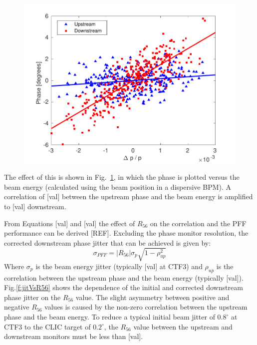 \documentclass[%
 reprint,
 superscriptaddress,
 amsmath,
 amssymb,
 prstab,
]{revtex4-1}
\begin{document}
\begin{figure}
	\includegraphics[width=\columnwidth]{figs/prop/UpDownEnCorr}
	\caption{\label{f:UpDownEnCorr}
	}
\end{figure}

The effect of this is shown in Fig.~\ref{f:UpDownEnCorr}, in which the phase is 
plotted versus the beam energy (calculated using the beam position in a 
dispersive BPM). A correlation of [val] between the upstream phase and the beam 
energy is amplified to [val] downstream.

From Equations [val] and [val] the effect of \(R_{56}\) on the correlation and 
the PFF performance can be derived [REF]. Excluding the phase monitor 
resolution, the 
corrected downstream phase jitter that can be achieved is given by:
\begin{equation}
\sigma_{PFF} = \left|R_{56}\right|\sigma_p\sqrt{1-\rho_{up}^2}
\label{e:r56PFFJit}
\end{equation}
Where \(\sigma_p\) is the beam energy jitter (typically [val] at CTF3) and 
\(\rho_{up}\) is the correlation between the upstream phase and the beam energy 
(typically [val]). Fig.\ref{f:jitVsR56} shows the dependence of the initial and 
corrected downstream phase jitter on the \(R_{56}\) value. The slight asymmetry 
between positive and negative \(R_{56}\) values is caused by the non-zero 
correlation between the upstream phase and the beam energy. To reduce a typical 
initial beam jitter of \(0.8^\circ\) at CTF3 to the CLIC target of 
\(0.2^\circ\), the \(R_{56}\) value between the upstream and downstream 
monitors must be less than [val].
\end{document}
